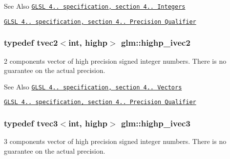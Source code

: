 \begin{DoxySeeAlso}{See Also}
\href{http://www.opengl.org/registry/doc/GLSLangSpec.4.20.8.pdf}{\tt G\-L\-S\-L 4.. specification, section 4.. Integers} 

\href{http://www.opengl.org/registry/doc/GLSLangSpec.4.20.8.pdf}{\tt G\-L\-S\-L 4.. specification, section 4.. Precision Qualifier} 
\end{DoxySeeAlso}
\hypertarget{group__core__precision_ga01acd79fbbe3d93a532276586b5c39ee}{
\subsubsection[{highp\-\_\-ivec2}]{\setlength{\rightskip}{0pt plus 5cm}typedef tvec2$<$int, highp$>$ {\bf glm\-::highp\-\_\-ivec2}}}\label{group__core__precision_ga01acd79fbbe3d93a532276586b5c39ee}
2 components vector of high precision signed integer numbers. There is no guarantee on the actual precision.

\begin{DoxySeeAlso}{See Also}
\href{http://www.opengl.org/registry/doc/GLSLangSpec.4.20.8.pdf}{\tt G\-L\-S\-L 4.. specification, section 4.. Vectors} 

\href{http://www.opengl.org/registry/doc/GLSLangSpec.4.20.8.pdf}{\tt G\-L\-S\-L 4.. specification, section 4.. Precision Qualifier} 
\end{DoxySeeAlso}
\hypertarget{group__core__precision_gaef51de6bc442bfce2602dc301708720a}{
\subsubsection[{highp\-\_\-ivec3}]{\setlength{\rightskip}{0pt plus 5cm}typedef tvec3$<$int, highp$>$ {\bf glm\-::highp\-\_\-ivec3}}}\label{group__core__precision_gaef51de6bc442bfce2602dc301708720a}
3 components vector of high precision signed integer numbers. There is no guarantee on the actual precision.

